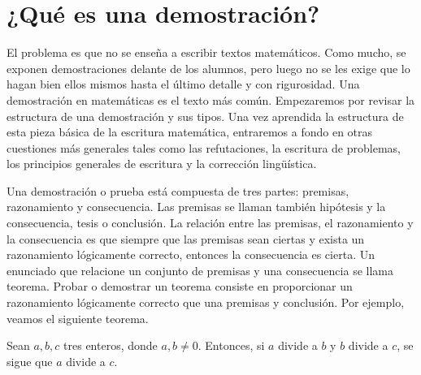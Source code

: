 \section{¿Qué es una demostración?}

El problema es que no se enseña a escribir textos matemáticos.
Como mucho, se exponen demostraciones delante de los alumnos, pero luego no se les exige que lo hagan bien ellos mismos hasta el último detalle y con rigurosidad.
Una demostración en matemáticas es el texto más común.
Empezaremos por revisar la estructura de una demostración y sus tipos.
Una vez aprendida la estructura de esta pieza básica de la escritura matemática, entraremos a fondo en otras cuestiones más generales tales como las refutaciones, la escritura de problemas, los principios generales de escritura y la corrección lingüística.

Una demostración o prueba está compuesta de tres partes: premisas, razonamiento y consecuencia.
Las premisas se llaman también hipótesis y la consecuencia, tesis o conclusión.
La relación entre las premisas, el razonamiento y la consecuencia es que siempre que las premisas sean ciertas y exista un razonamiento lógicamente correcto, entonces la consecuencia es cierta.
Un enunciado que relacione un conjunto de premisas y una consecuencia se llama teorema.
Probar o demostrar un teorema consiste en proporcionar un razonamiento lógicamente correcto que una premisas y conclusión.
Por ejemplo, veamos el siguiente teorema.

\begin{theorem}
    Sean $a,b,c$ tres enteros, donde $a,b \neq 0$.
    Entonces, si $a$ divide a $b$ y $b$ divide a $c$, se sigue que $a$ divide a $c$.
\end{theorem}

